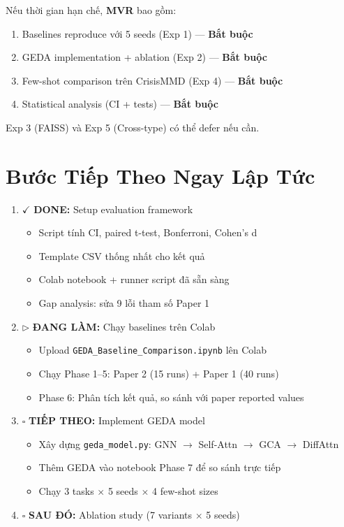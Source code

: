 \documentclass[12pt,a4paper]{article}
\begin{document}
\begin{goalbox}
Nếu thời gian hạn chế, \textbf{MVR} bao gồm:
\begin{enumerate}
  \item Baselines reproduce với 5 seeds (Exp 1) — \textbf{Bắt buộc}
  \item GEDA implementation + ablation (Exp 2) — \textbf{Bắt buộc}
  \item Few-shot comparison trên CrisisMMD (Exp 4) — \textbf{Bắt buộc}
  \item Statistical analysis (CI + tests) — \textbf{Bắt buộc}
\end{enumerate}
Exp 3 (FAISS) và Exp 5 (Cross-type) có thể defer nếu cần.
\end{goalbox}

\section{Bước Tiếp Theo Ngay Lập Tức}

\begin{enumerate}[leftmargin=*]
  \item \textcolor{done}{$\checkmark$} \textbf{DONE:} Setup evaluation framework
    \begin{itemize}
      \item Script tính CI, paired t-test, Bonferroni, Cohen's d
      \item Template CSV thống nhất cho kết quả
      \item Colab notebook + runner script đã sẵn sàng
      \item Gap analysis: sửa 9 lỗi tham số Paper 1
    \end{itemize}
  \item \textcolor{inprog}{$\triangleright$} \textbf{ĐANG LÀM:} Chạy baselines trên Colab
    \begin{itemize}
      \item Upload \texttt{GEDA\_Baseline\_Comparison.ipynb} lên Colab
      \item Chạy Phase 1--5: Paper 2 (15 runs) + Paper 1 (40 runs)
      \item Phase 6: Phân tích kết quả, so sánh với paper reported values
    \end{itemize}
  \item \textcolor{todo}{$\square$} \textbf{TIẾP THEO:} Implement GEDA model
    \begin{itemize}
      \item Xây dựng \texttt{geda\_model.py}: GNN $\rightarrow$ Self-Attn $\rightarrow$ GCA $\rightarrow$ DiffAttn
      \item Thêm GEDA vào notebook Phase 7 để so sánh trực tiếp
      \item Chạy 3 tasks $\times$ 5 seeds $\times$ 4 few-shot sizes
    \end{itemize}
  \item \textcolor{todo}{$\square$} \textbf{SAU ĐÓ:} Ablation study (7 variants $\times$ 5 seeds)
\end{enumerate}
\end{document}
